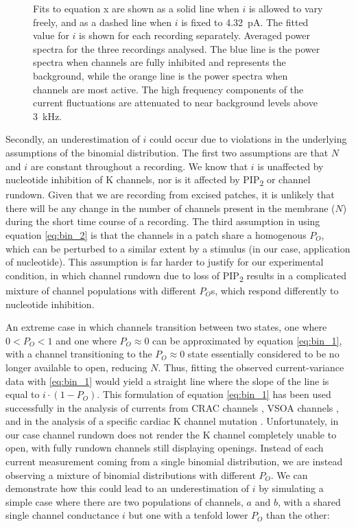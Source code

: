 \begin{figure}[h]
{	Fits to equation x are shown as a solid line when $i$ is allowed to vary freely, and as a dashed line when $i$ is fixed to \SI{4.32}{\pico\ampere}.
	The fitted value for $i$ is shown for each recording separately.
	 Averaged power spectra for the three recordings analysed.
	The blue line is the power spectra when channels are fully inhibited and represents the background, while the orange line is the power spectra when channels are most active.
	The high frequency components of the current fluctuations are attenuated to near background levels above \SI{3}{\kilo\hertz}.
	}\label{ch4fig:noise_manual}
\end{figure}

Secondly, an underestimation of $i$ could occur due to violations in the underlying assumptions of the binomial distribution.
The first two assumptions are that $N$ and $i$ are constant throughout a recording.
We know that $i$ is unaffected by nucleotide inhibition of K\ATP{} channels, nor is it affected by PIP\textsubscript{2} or channel rundown.
Given that we are recording from excised patches, it is unlikely that there will be any change in the number of channels present in the membrane ($N$) during the short time course of a recording.
The third assumption in using equation \ref{eq:bin_2} is that the channels in a patch share a homogenous $P_O$, which can be perturbed to a similar extent by a stimulus (in our case, application of nucleotide).
This assumption is far harder to justify for our experimental condition, in which channel rundown due to loss of PIP\textsubscript{2} results in a complicated mixture of channel populations with different $P_O$s, which respond differently to nucleotide inhibition.

An extreme case in which channels transition between two states, one where $0 < P_O < 1$ and one where $P_O \approx 0$ can be approximated by equation \ref{eq:bin_1}, with a channel transitioning to the $P_O \approx 0$ state essentially considered to be no longer available to open, reducing $N$.
Thus, fitting the observed current-variance data with \ref{eq:bin_1} would yield a straight line where the slope of the line is equal to $i \cdot (1 - P_O)$.
This formulation of equation \ref{eq:bin_1} has been used successfully in the analysis of currents from CRAC channels \cite{prakriya_regulation_2006}, VSOA channels \cite{jackson_single-channel_1995, jackson_single_1996}, and in the analysis of a specific cardiac K\ATP{} channel mutation \cite{tammaro_mutation_2007}.
Unfortunately, in our case channel rundown does not render the K\ATP{} channel completely unable to open, with fully rundown channels still displaying openings.
Instead of each current measurement coming from a single binomial distribution, we are instead observing a mixture of binomial distributions with different $P_O$.
We can demonstrate how this could lead to an underestimation of $i$ by simulating a simple case where there are two populations of channels, $a$ and $b$, with a shared single channel conductance $i$ but one with a tenfold lower $P_O$ than the other:

